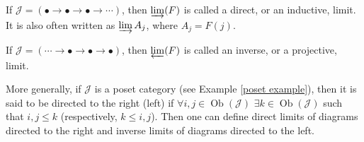 \documentclass[english,letterpaper]{article}%
\numberwithin{equation}{section}
\numberwithin{figure}{section}
\numberwithin{table}{section}
\theoremstyle{definition}
\theoremstyle{definition}
\theoremstyle{definition}
\theoremstyle{plain}
\theoremstyle{plain}
\theoremstyle{plain}
\theoremstyle{plain}
\theoremstyle{remark}
\theoremstyle{remark}
\newcommand{\calJ}{\mathcal{J}}
\renewcommand{\leq}{\leqslant}
\DeclareMathOperator{\ob}{Ob}
\newcommand{\colimit}{\varinjlim}
\newcommand{\limit}{\varprojlim}
\begin{document}
\begin{defn}
    If $\calJ=(\bullet\to\bullet\to\bullet\to\cdots)$, then $\colimit(F)$ is called a direct, or an inductive, limit. It is also often written as $\colimit A_j$, where $A_j=F(j)$.
    
    If $\calJ=(\cdots\to\bullet\to\bullet\to\bullet)$, then $\limit(F)$ is called an inverse, or a projective, limit.
    
    More generally, if $\calJ$ is a poset category (see Example \ref{poset example}), then it is said to be directed to the right (left) if $\forall i,j\in \ob(\calJ)$ $\exists k\in \ob(\calJ)$ such that $i,j\leq k$ (respectively, $k\leq i,j$). Then one can define direct limits of diagrams directed to the right and inverse limits of diagrams directed to the left.
\end{defn}
\end{document}
